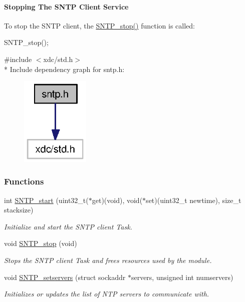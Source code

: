 \paragraph*{Stopping The S\+N\+T\+P Client Service}

To stop the S\+N\+T\+P client, the \hyperlink{sntp_8h_aaab818e780a8ec9e87aa39a4d9a31f89}{S\+N\+T\+P\+\_\+stop()} function is called\+: 
\begin{DoxyCode}
SNTP_stop();
\end{DoxyCode}
 

{\ttfamily \#include $<$xdc/std.\+h$>$}\\*
Include dependency graph for sntp.\+h\+:
\nopagebreak
\begin{figure}[H]
\begin{center}
\leavevmode
\includegraphics[width=93pt]{sntp_8h__incl}
\end{center}
\end{figure}
\subsubsection*{Functions}
\begin{DoxyCompactItemize}
\item 
int \hyperlink{sntp_8h_a0b8765ce6d90d7d171d740b2eedde328}{S\+N\+T\+P\+\_\+start} (uint32\+\_\+t($\ast$get)(void), void($\ast$set)(uint32\+\_\+t newtime), size\+\_\+t stacksize)
\begin{DoxyCompactList}\small\item\em Initialize and start the S\+N\+T\+P client Task. \end{DoxyCompactList}\item 
void \hyperlink{sntp_8h_aaab818e780a8ec9e87aa39a4d9a31f89}{S\+N\+T\+P\+\_\+stop} (void)
\begin{DoxyCompactList}\small\item\em Stops the S\+N\+T\+P client Task and frees resources used by the module. \end{DoxyCompactList}\item 
void \hyperlink{sntp_8h_a34409ecc254ee5abf525c69909d3df59}{S\+N\+T\+P\+\_\+setservers} (struct sockaddr $\ast$servers, unsigned int numservers)
\begin{DoxyCompactList}\small\item\em Initializes or updates the list of N\+T\+P servers to communicate with. \end{DoxyCompactList}\end{DoxyCompactItemize}


